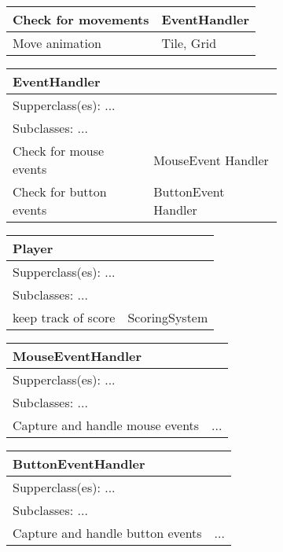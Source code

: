 \begin{figure}[H]
\begin{subfigure}{}
\begin{tabular}{|p{1in}|p{1in}|}
			Check for movements & EventHandler \\ \hline
			Move animation & Tile, Grid \\ \hline
		\end{tabular}
\end{subfigure}
\begin{subfigure}{}
		\begin{tabular}{|p{1in}|p{1in}|}
			\hline
			\multicolumn{2}{|p{2in}|}{\textbf{EventHandler}} \\ \hline
			\multicolumn{2}{|p{2in}|}{Supperclass(es): ...} \\ \hline
			\multicolumn{2}{|p{2in}|}{Subclasses: ...} \\ \hline
			Check for mouse events & MouseEvent Handler \\ \hline
			Check for button events & ButtonEvent Handler \\ \hline
		\end{tabular}
		\begin{tabular}{|p{1in}|p{1in}|}
			\hline
			\multicolumn{2}{|p{2in}|}{\textbf{Player}} \\ \hline
			\multicolumn{2}{|p{2in}|}{Supperclass(es): ...} \\ \hline
			\multicolumn{2}{|p{2in}|}{Subclasses: ...} \\ \hline
			keep track of score & ScoringSystem \\ \hline
		\end{tabular}
\end{subfigure}
\begin{subfigure}{}
		\begin{tabular}{|p{1in}|p{1in}|}
			\hline
			\multicolumn{2}{|p{2in}|}{\textbf{MouseEventHandler}} \\ \hline
			\multicolumn{2}{|p{2in}|}{Supperclass(es): ...} \\ \hline
			\multicolumn{2}{|p{2in}|}{Subclasses: ...} \\ \hline
			Capture and handle mouse events & ... \\ \hline
		\end{tabular}
		\begin{tabular}{|p{1in}|p{1in}|}
			\hline
			\multicolumn{2}{|p{2in}|}{\textbf{ButtonEventHandler}} \\ \hline
			\multicolumn{2}{|p{2in}|}{Supperclass(es): ...} \\ \hline
			\multicolumn{2}{|p{2in}|}{Subclasses: ...} \\ \hline
			Capture and handle button events & ... \\ \hline

\end{tabular}
\end{subfigure}
\end{figure}
